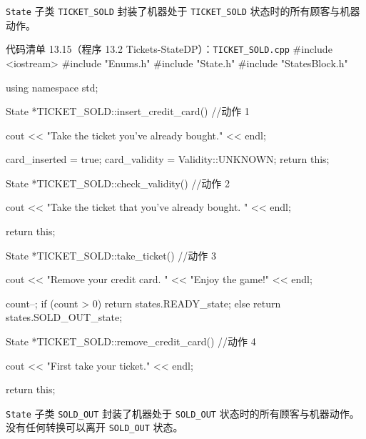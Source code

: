 \texttt{State} 子类 \texttt{TICKET\_\allowbreak{}SOLD} 封装了机器处于 \texttt{TICKET\_\allowbreak{}SOLD} 状态时的所有顾客与机器动作。

\begin{codeboxt}{代码清单 13.15（程序 13.2 Tickets-StateDP）：\texttt{TICKET\_\allowbreak{}SOLD.\allowbreak{}cpp}}
#include <iostream>
#include "Enums.h"
#include "State.h"
#include "StatesBlock.h"

using namespace std;

State *TICKET_SOLD::insert_credit_card()  //动作 1
{
    cout << "Take the ticket you’ve already bought."
         << endl;

    card_inserted = true;
    card_validity = Validity::UNKNOWN;
    return this;
}

State *TICKET_SOLD::check_validity()  //动作 2
{
    cout << "Take the ticket that you’ve already bought. "
         << endl;

    return this;
}

State *TICKET_SOLD::take_ticket()  //动作 3
{
    cout << "Remove your credit card. "
         << "Enjoy the game!" << endl;

    count--;
    if (count > 0)
    {
        return states.READY_state;
    }
    else
    {
        return states.SOLD_OUT_state;
    }
}

State *TICKET_SOLD::remove_credit_card()  //动作 4
{
    cout << "First take your ticket." << endl;

    return this;
}
\end{codeboxt}

\texttt{State} 子类 \texttt{SOLD\_OUT} 封装了机器处于 \texttt{SOLD\_OUT} 状态时的所有顾客与机器动作。没有任何转换可以离开 \texttt{SOLD\_OUT} 状态。

